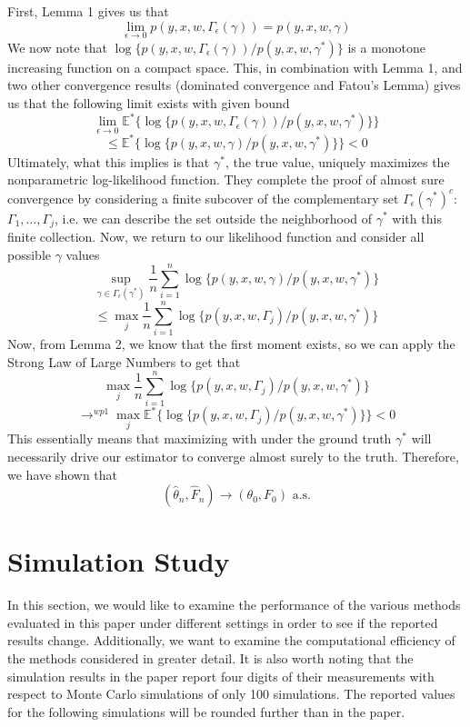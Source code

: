 \documentclass[11pt]{article}
\begin{document}
First, Lemma 1 gives us that 
\[
\lim_{\epsilon\rightarrow0}p(y,x,w,\Gamma_{\epsilon}(\gamma))= p(y,x,w,\gamma)
\]
We now note that $\log\{p(y,x,w,\Gamma_\epsilon (\gamma))/p(y,x,w,\gamma^*)\}$ is a monotone increasing function on a compact space. This, in combination with Lemma 1, and two other convergence results (dominated convergence and Fatou's Lemma) gives us that the following limit exists with given bound
\[
\lim_{\epsilon\rightarrow0}\mathbb{E}^*\{\log\{p(y,x,w,\Gamma_\epsilon (\gamma))/p(y,x,w,\gamma^*)\}\}
\]
\[
\leq \mathbb{E}^*\{\log\{p(y,x,w,\gamma)/p(y,x,w,\gamma^*)\}\} < 0
\]
Ultimately, what this implies is that $\gamma^*$, the true value, uniquely maximizes the nonparametric log-likelihood function. They complete the proof of almost sure convergence by considering a finite subcover of the complementary set $\Gamma_{\epsilon}(\gamma^*)^c$: $\Gamma_1,\dots,\Gamma_j$, i.e. we can describe the set outside the neighborhood of $\gamma^*$ with this finite collection. Now, we return to our likelihood function and consider all possible $\gamma$ values
\[
\sup_{\gamma\in\Gamma_\epsilon(\gamma^*)} \frac{1}{n}\sum_{i=1}^n\log\{p(y,x,w,\gamma)/p(y,x,w,\gamma^*)\}
\]
\[
\leq \max_j\frac{1}{n}\sum_{i=1}^n\log\{p(y,x,w,\Gamma_j)/p(y,x,w,\gamma^*)\}
\]
Now, from Lemma 2, we know that the first moment exists, so we can apply the Strong Law of Large Numbers to get that
\[
\max_j\frac{1}{n}\sum_{i=1}^n\log\{p(y,x,w,\Gamma_j)/p(y,x,w,\gamma^*)\}
\]
\[
\rightarrow^{wp1} \max_j \mathbb{E}^*\{\log\{p(y,x,w,\Gamma_j)/p(y,x,w,\gamma^*)\}\} <0
\]
This essentially means that maximizing with under the ground truth $\gamma^*$ will necessarily drive our estimator to converge almost surely to the truth. Therefore, we have shown that
\[
(\hat \theta_n, \hat F_n) \rightarrow (\theta_0,F_0) \text{ a.s.}
\]


\section{Simulation Study}

\indent

In this section, we would like to examine the performance of the various methods evaluated in this paper under different settings in order to see if the reported results change. Additionally, we want to examine the computational efficiency of the methods considered in greater detail. It is also worth noting that the simulation results in the paper report four digits of their measurements with respect to Monte Carlo simulations of only 100 simulations. The reported values for the following simulations will be rounded further than in the paper. 
\end{document}
